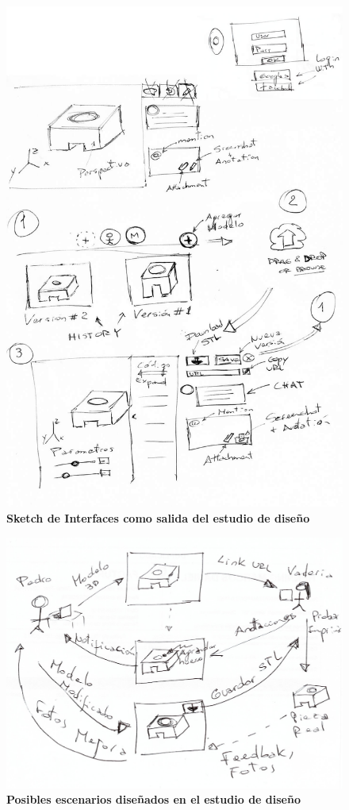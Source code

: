 \begin{figure}[H]
\includegraphics[width=14cm]{Img/UX/edc.jpg}
\centering
\caption{\textbf{ \footnotesize{Sketch de Interfaces como salida del estudio de diseño}}}
\end{figure}


\begin{figure}[H]
\includegraphics[width=14cm]{Img/UX/ed2.jpg}
\centering
\caption{\textbf{ \footnotesize{Posibles escenarios diseñados en el estudio de diseño}}}
\end{figure}

